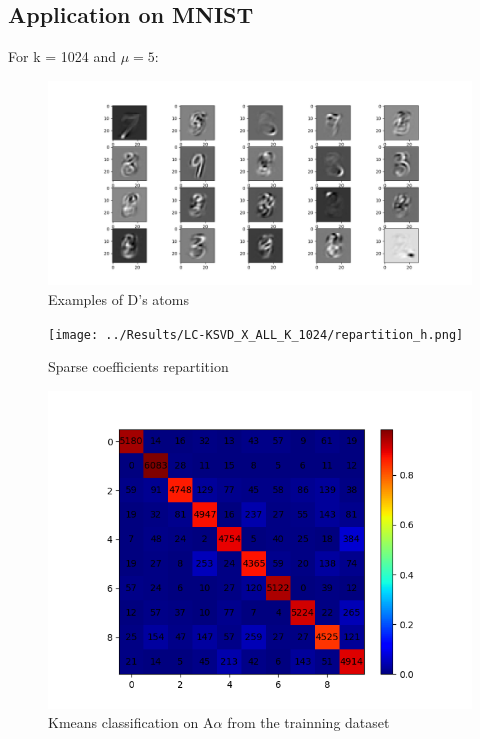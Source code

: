 
\subsection{Application on MNIST}
For k = 1024 and $\mu = 5$:

\begin{figure}[h]
 \centering
 \includegraphics[scale=0.5]{../Results/LC-KSVD_X_ALL_K_1024/D.png}
 \caption{Examples of D's atoms}
\end{figure}

\begin{figure}[h]
 \centering
 \texttt{[image: ../Results/LC-KSVD\_X\_ALL\_K\_1024/repartition\_h.png]}
 \caption{Sparse coefficients repartition}
\end{figure}
\begin{figure}[h]
 \centering
 \includegraphics[scale=0.72]{../Results/LC-KSVD_X_ALL_K_1024/confusion_matrix_train.png}
 \caption{Kmeans classification on A$\alpha$ from the trainning dataset}
\end{figure}


